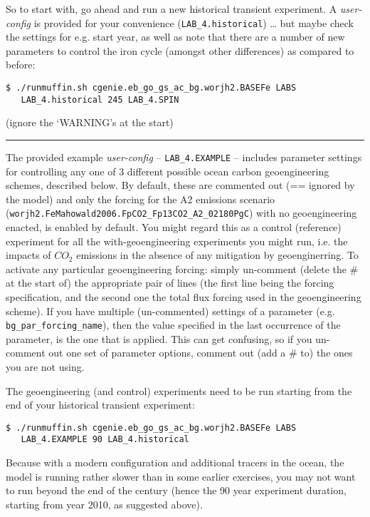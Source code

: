 \documentclass[11pt,fleqn]{book} %
\begin{document}
\noindent So to start with, go ahead and run a new historical transient experiment. A \textit{user-config} is provided for your convenience (\texttt{LAB\_4.historical}) … but maybe check the settings for e.g. start year, as well as note that there are a number of new parameters to control the iron cycle (amongst other differences) as compared to before:
\vspace{-2pt}\begin{verbatim}
$ ./runmuffin.sh cgenie.eb_go_gs_ac_bg.worjh2.BASEFe LABS
   LAB_4.historical 245 LAB_4.SPIN
\end{verbatim}\vspace{-2pt}
(ignore the ‘WARNING’s at the start)

\vspace{1mm}
\noindent\rule{4cm}{0.1mm}
\vspace{2mm}

\noindent The provided example \textit{user-config} -- \texttt{LAB\_4.EXAMPLE} -- includes parameter settings for controlling any one of 3 different possible ocean carbon geoengineering schemes, described below. By default, these are commented out (== ignored by the model) and only the forcing for the A2 emissions scenario (\texttt{worjh2.FeMahowald2006.FpCO2\_Fp13CO2\_A2\_02180PgC}) with no geoengineering enacted,  is enabled by default. You might regard this as a control (reference) experiment for all the with-geoengineering experiments you might run, i.e. the impacts of \(CO_{2}\) emissions in the absence of any mitigation by geoenginerring. To activate any particular geoengineering forcing: simply un-comment (delete the \# at the start of) the appropriate pair of lines (the first line being the forcing specification, and the second one the total flux forcing used in the geoengineering scheme). If you have multiple (un-commented) settings of a parameter (e.g. \texttt{bg\_par\_forcing\_name}), then the value specified in the last occurrence of the parameter, is the one that is applied. This can get confusing, so if you un-comment out one set of parameter options, comment out (add a \# to) the ones you are not using.

The geoengineering (and control) experiments need to be run starting from the end of your historical transient experiment:
\vspace{-2pt}\begin{verbatim}
$ ./runmuffin.sh cgenie.eb_go_gs_ac_bg.worjh2.BASEFe LABS
   LAB_4.EXAMPLE 90 LAB_4.historical
\end{verbatim}\vspace{-2pt}
Because with a modern configuration and additional tracers in the ocean, the model is running rather slower than in some earlier exercises, you may not want to run beyond the end of the century (hence the 90 year experiment duration, starting from year 2010, as suggested above).
\end{document}

